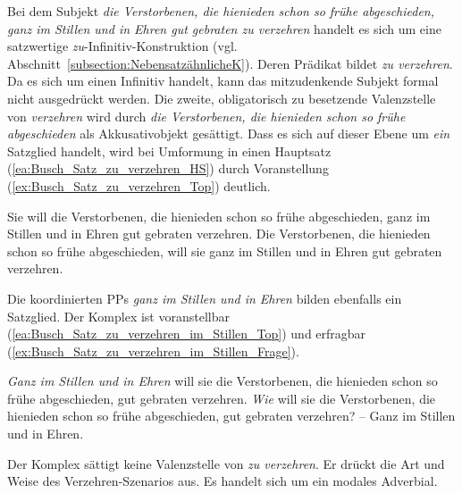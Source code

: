 \ea \label{ea:Busch_Satz_beste_wär_wohl}
\label{ea:Busch_Satz_beste_wär_wohl_HS}
\label{ex:Busch_Satz_beste_wär_wohl_*Frage}
\z 
\z 

Bei dem Subjekt \textit{die Verstorbenen, die hienieden schon so frühe abgeschieden, ganz im Stillen und in Ehren gut gebraten zu verzehren} handelt es sich um eine satzwertige \textit{zu}-Infinitiv-Konstruktion (vgl. Abschnitt~\ref{subsection:NebensatzähnlicheK}). Deren Prädikat bildet \textit{zu verzehren}. Da es sich um einen Infinitiv handelt, kann das mitzudenkende Subjekt formal nicht ausgedrückt werden. Die zweite, obligatorisch zu besetzende Valenzstelle von \textit{verzehren} wird durch \textit{die Verstorbenen, die hienieden schon so frühe abgeschieden} als Akkusativobjekt gesättigt. Dass es sich auf dieser Ebene um \textit{ein} Satzglied handelt, wird bei Umformung in einen Hauptsatz (\ref{ea:Busch_Satz_zu_verzehren_HS}) durch Voranstellung (\ref{ex:Busch_Satz_zu_verzehren_Top}) deutlich.

\ea \label{ea:Busch_Satz_zu_verzehren_HS_TOP}
\ea \label{ea:Busch_Satz_zu_verzehren_HS} Sie will die Verstorbenen, die hienieden schon so frühe abgeschieden, ganz im Stillen und in Ehren gut gebraten verzehren.
\ex \label{ex:Busch_Satz_zu_verzehren_Top} {Die Verstorbenen, die hienieden schon so frühe abgeschieden}, will sie ganz im Stillen und in Ehren gut gebraten verzehren.
\z 
\z 

Die koordinierten PPs \textit{ganz im Stillen und in Ehren} bilden ebenfalls ein Satzglied. Der Komplex ist voranstellbar (\ref{ea:Busch_Satz_zu_verzehren_im_Stillen_Top}) und erfragbar (\ref{ex:Busch_Satz_zu_verzehren_im_Stillen_Frage}).

\ea \label{ea:Busch_Satz_zu_verzehren_im_Stillen}
\ea \label{ea:Busch_Satz_zu_verzehren_im_Stillen_Top} \textit{Ganz im Stillen und in Ehren} will sie die Verstorbenen, die hienieden schon so frühe abgeschieden, gut gebraten verzehren.
\ex \label{ex:Busch_Satz_zu_verzehren_im_Stillen_Frage} \textit{Wie} will sie die Verstorbenen, die hienieden schon so frühe abgeschieden,  gut gebraten verzehren? -- Ganz im Stillen und in Ehren.
\z 
\z 

Der Komplex sättigt keine Valenzstelle von \textit{zu verzehren}. Er drückt die Art und Weise des Verzehren-Szenarios aus. Es handelt sich um ein modales Adverbial.

